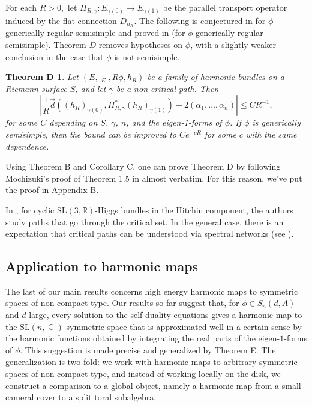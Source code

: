 \documentclass[10pt]{amsart}
\newcommand{\R}{\mathbb R}
\DeclareMathOperator{\dbar}{\overline{\partial}}
\newtheorem*{thmd}{Theorem D}
\theoremstyle{definition}
\DeclareMathOperator{\C}{\mathbb{C}}
\begin{document}
For each $R>0,$  let $\Pi_{R,\gamma}: E_{\gamma(0)}\to E_{\gamma(1)}$ be the parallel transport operator induced by the flat connection $D_{h_R}$. The following is conjectured in \cite{KNPS} for $\phi$ generically regular semisimple and proved in \cite[Theorem 1.5]{Mo} (for $\phi$ generically regular semisimple). Theorem $D$ removes hypotheses on $\phi$, with a slightly weaker conclusion in the case that $\phi$ is not semisimple.

\begin{thmd} Let $(E, \dbar_E, R\phi, h_R)$ be a family of harmonic bundles on a Riemann surface $S$, and let $\gamma$ be a non-critical path. Then
   $$|\frac{1}{R}\vec{d}((h_R)_{\gamma(0)},\Pi_{R,\gamma}^*(h_R)_{\gamma(1)})-2(\alpha_1,\dots, \alpha_n)|\leq CR^{-1},$$
   for some $C$ depending on $S$, $\gamma$, $n$, and the eigen-1-forms of $\phi$. If $\phi$ is generically semisimple, then the bound can be improved to $C e^{-cR}$ for some $c$ with the same dependence.
\end{thmd}
Using Theorem B and Corollary C, one can prove Theorem D by following Mochizuki's proof of Theorem 1.5 in \cite{Mo} almost verbatim. For this reason, we've put the proof in Appendix B.


In \cite{LTW}, for cyclic $\textrm{SL}(3,\R)$-Higgs bundles in the Hitchin component, the authors study paths that go through the critical set. In the general case, there is an expectation that critical paths can be understood via spectral networks (see \cite[section 3.4]{KNPS}).

\subsection{Application to harmonic maps}
The last of our main results concerns high energy harmonic maps to symmetric spaces of non-compact type. Our results so far suggest that, for $\phi \in S_n(d,A)$ and $d$ large, every solution to the self-duality equations gives a harmonic map to the $\textrm{SL}(n,\C)$-symmetric space that is approximated well in a certain sense by the harmonic functions obtained by integrating the real parts of the eigen-$1$-forms of $\phi$. This suggestion is made precise and generalized by Theorem E. The generalization is two-fold: we work with harmonic maps to arbitrary symmetric spaces of non-compact type, and instead of working locally on the disk, we construct a comparison to a global object, namely a harmonic map from a small cameral cover to a split toral subalgebra. 
\end{document}

